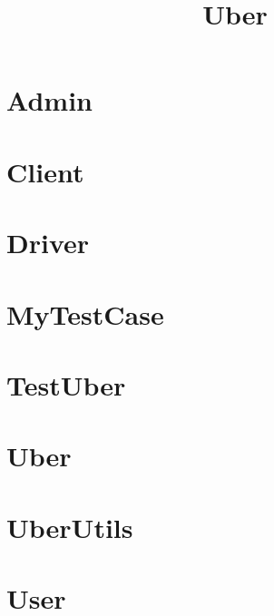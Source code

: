\documentclass{article}
\begin{document}
\title{Uber}
\author{}
\maketitle
\tableofcontents

\section{Admin}

\section{Client}

\section{Driver}

\section{MyTestCase}

\section{TestUber}

\section{Uber}

\section{UberUtils}

\section{User}

\end{document}
